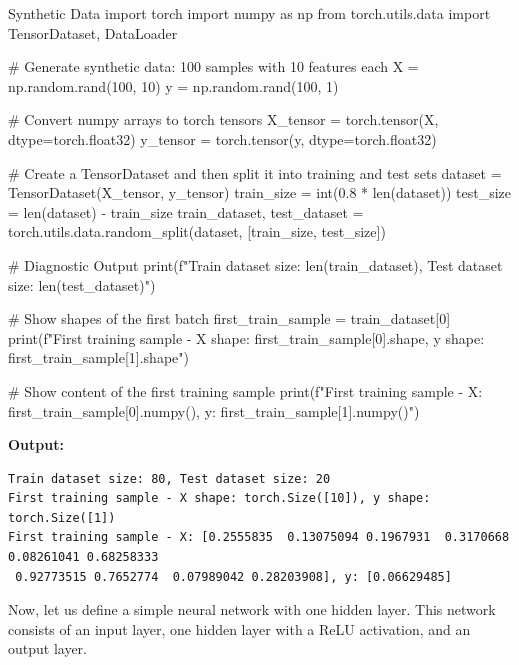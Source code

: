 \begin{codeonly}{Synthetic Data}
import torch
import numpy as np
from torch.utils.data import TensorDataset, DataLoader

# Generate synthetic data: 100 samples with 10 features each
X = np.random.rand(100, 10)
y = np.random.rand(100, 1)

# Convert numpy arrays to torch tensors
X_tensor = torch.tensor(X, dtype=torch.float32)
y_tensor = torch.tensor(y, dtype=torch.float32)

# Create a TensorDataset and then split it into training and test sets
dataset = TensorDataset(X_tensor, y_tensor)
train_size = int(0.8 * len(dataset))
test_size = len(dataset) - train_size
train_dataset, test_dataset = torch.utils.data.random_split(dataset, [train_size, test_size])

# Diagnostic Output
print(f"Train dataset size: {len(train_dataset)}, Test dataset size: {len(test_dataset)}")

# Show shapes of the first batch
first_train_sample = train_dataset[0]
print(f"First training sample - X shape: {first_train_sample[0].shape}, y shape: {first_train_sample[1].shape}")

# Show content of the first training sample
print(f"First training sample - X: {first_train_sample[0].numpy()}, y: {first_train_sample[1].numpy()}")
\end{codeonly}


\textbf{Output:}
\begin{lstlisting}
Train dataset size: 80, Test dataset size: 20
First training sample - X shape: torch.Size([10]), y shape: torch.Size([1])
First training sample - X: [0.2555835  0.13075094 0.1967931  0.3170668  0.08261041 0.68258333
 0.92773515 0.7652774  0.07989042 0.28203908], y: [0.06629485]
\end{lstlisting}

%


Now, let us define a simple neural network with one hidden layer. This network consists of an input layer, one hidden layer with a ReLU activation, and an output layer.

